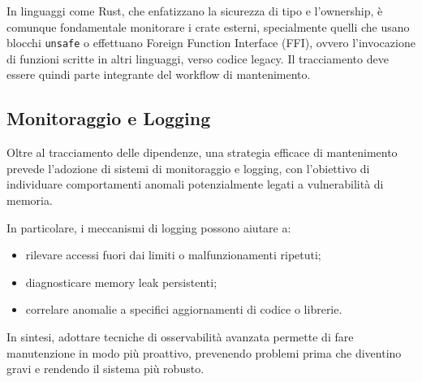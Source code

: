 In linguaggi come Rust, che enfatizzano la sicurezza di tipo e l'ownership, è
comunque fondamentale monitorare i crate esterni, specialmente quelli che usano blocchi
\texttt{unsafe} o effettuano Foreign Function Interface (FFI), ovvero l'invocazione
di funzioni scritte in altri linguaggi, verso codice legacy. Il tracciamento deve
essere quindi parte integrante del workflow di mantenimento.

\subsection{Monitoraggio e Logging}
\label{sec:monitoraggio-logging}

Oltre al tracciamento delle dipendenze, una strategia efficace di mantenimento prevede
l'adozione di sistemi di monitoraggio e logging, con l'obiettivo di individuare
comportamenti anomali potenzialmente legati a vulnerabilità di memoria.

In particolare, i meccanismi di logging possono aiutare a:
\begin{itemize}
  \item rilevare accessi fuori dai limiti o malfunzionamenti ripetuti;

  \item diagnosticare memory leak persistenti;

  \item correlare anomalie a specifici aggiornamenti di codice o librerie.
\end{itemize}

In sintesi, adottare tecniche di osservabilità avanzata permette di fare
manutenzione in modo più proattivo, prevenendo problemi prima che diventino gravi
e rendendo il sistema più robusto.